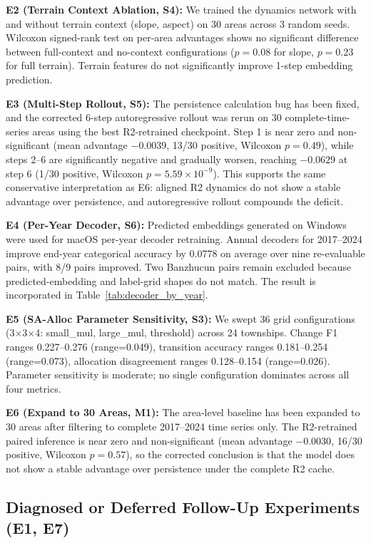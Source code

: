 \documentclass{article}
\begin{document}
\textbf{E2 (Terrain Context Ablation, S4):} We trained the dynamics network with and without terrain context (slope, aspect) on 30 areas across 3 random seeds. Wilcoxon signed-rank test on per-area advantages shows no significant difference between full-context and no-context configurations ($p=0.08$ for slope, $p=0.23$ for full terrain). Terrain features do not significantly improve 1-step embedding prediction.

\textbf{E3 (Multi-Step Rollout, S5):} The persistence calculation bug has been fixed, and the corrected 6-step autoregressive rollout was rerun on 30 complete-time-series areas using the best R2-retrained checkpoint. Step 1 is near zero and non-significant (mean advantage $-0.0039$, 13/30 positive, Wilcoxon $p=0.49$), while steps 2--6 are significantly negative and gradually worsen, reaching $-0.0629$ at step 6 (1/30 positive, Wilcoxon $p=5.59\times10^{-9}$). This supports the same conservative interpretation as E6: aligned R2 dynamics do not show a stable advantage over persistence, and autoregressive rollout compounds the deficit.

\textbf{E4 (Per-Year Decoder, S6):} Predicted embeddings generated on Windows were used for macOS per-year decoder retraining. Annual decoders for 2017--2024 improve end-year categorical accuracy by 0.0778 on average over nine re-evaluable pairs, with 8/9 pairs improved. Two Banzhucun pairs remain excluded because predicted-embedding and label-grid shapes do not match. The result is incorporated in Table~\ref{tab:decoder_by_year}.

\textbf{E5 (SA-Alloc Parameter Sensitivity, S3):} We swept 36 grid configurations (3$\times$3$\times$4: small\_mul, large\_mul, threshold) across 24 townships. Change F1 ranges 0.227--0.276 (range=0.049), transition accuracy ranges 0.181--0.254 (range=0.073), allocation disagreement ranges 0.128--0.154 (range=0.026). Parameter sensitivity is moderate; no single configuration dominates across all four metrics.

\textbf{E6 (Expand to 30 Areas, M1):} The area-level baseline has been expanded to 30 areas after filtering to complete 2017--2024 time series only. The R2-retrained paired inference is near zero and non-significant (mean advantage $-0.0030$, 16/30 positive, Wilcoxon $p=0.57$), so the corrected conclusion is that the model does not show a stable advantage over persistence under the complete R2 cache.

\subsection{Diagnosed or Deferred Follow-Up Experiments (E1, E7)}
\label{sec:inprogress_experiments}
\end{document}

